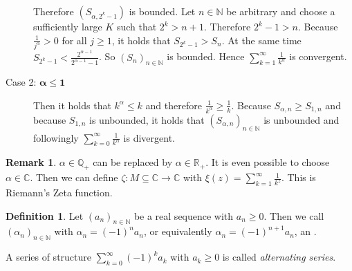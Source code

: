 \documentclass[a4paper,landscape,twocolumn]{article}
\theoremstyle{definition}
\newtheorem{defi}{Definition}
\newtheorem{rem}{Remark}
\newcommand\seq[1]{{\left(#1\right)}_{n \in \mathbb N}}
\begin{document}
\begin{description}
    Therefore $(S_{\alpha,2^k-1})$ is bounded.
    Let $n \in \mathbb N$ be arbitrary and choose a sufficiently large $K$ such that $2^k > n+1$. Therefore $2^k-1 > n$.
    Because $\frac{1}{j^\alpha} > 0$ for all $j \geq 1$, it holds that $S_{2^k-1} > S_n$.
    At the same time $S_{2^k-1} < \frac{2^{\alpha-1}}{2^{\alpha-1}-1}$. So $\seq{S_n}$ is bounded.
    Hence $\sum_{k=1}^\infty \frac{1}{k^\alpha}$ is convergent.
  \item[Case 2: $\mathbf{\alpha \leq 1}$]
    Then it holds that $k^\alpha \leq k$ and therefore $\frac{1}{k^\alpha} \geq \frac1{k}$.
    Because $S_{\alpha,n} \geq S_{1,n}$ and because $S_{1,n}$ is unbounded, it holds that
    $\seq{S_{\alpha,n}}$ is unbounded and followingly $\sum_{k=0}^\infty \frac1{k^\alpha}$ is divergent.
\end{description}

\begin{rem}
  $\alpha \in \mathbb Q_+$ can be replaced by $\alpha \in \mathbb R_+$.
  It is even possible to choose $\alpha \in \mathbb C$.
  Then we can define $\zeta: M \subseteq \mathbb C \to \mathbb C$
  with $\xi(z) = \sum_{k=1}^\infty \frac{1}{k^z}$.
  This is Riemann's Zeta function.
\end{rem}

\begin{defi}
  Let $\seq{a_n}$ be a real sequence with $a_n \geq 0$.
  Then we call $\seq{\alpha_n}$ with $\alpha_n = (-1)^n a_n$, or equivalently
  $\alpha_n = (-1)^{n+1} a_n$, an .

  A series of structure $\sum_{k=0}^\infty (-1)^k a_k$ with $a_k \geq 0$
  is called \emph{alternating series}.
\end{defi}
\end{document}
